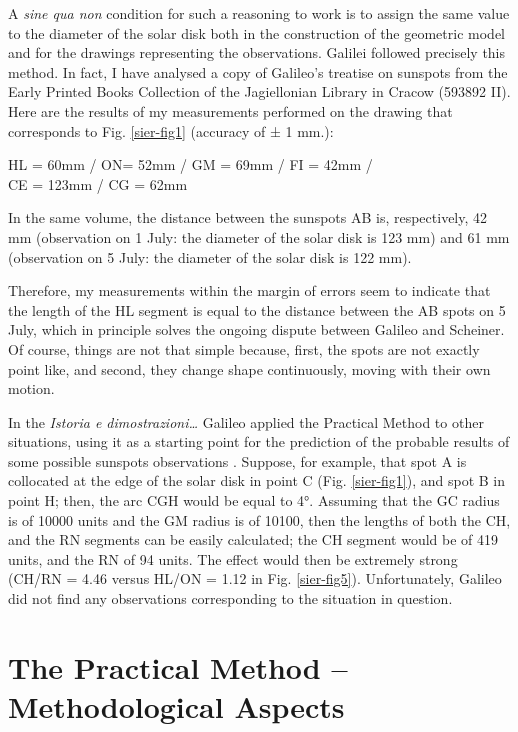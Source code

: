 \begin{artengenv}
A \textit{sine qua non} condition for such a reasoning to work is to assign the same value to the diameter of the solar
disk both in the construction of the geometric model and for the drawings representing the observations. Galilei
followed precisely this method. In fact, I have analysed a copy of Galileo’s treatise on sunspots from the Early
Printed Books Collection of the Jagiellonian Library in Cracow (593892 II). Here are the results of my measurements
performed on the drawing that corresponds to Fig. \ref{sier-fig1} (accuracy of ± 1 mm.):
\medskip

{\centering
HL = 60mm / ON= 52mm / GM = 69mm / FI = 42mm /\\CE = 123mm / CG = 62mm
\par}
\smallskip

In the same volume, the distance between the sunspots AB is, respectively, 42 mm (observation on 1 July: the diameter of
the solar disk is 123 mm) and 61 mm (observation on 5 July: the diameter of the solar disk is 122 mm).

Therefore, my measurements within the margin of errors seem to indicate that the length of the HL segment is equal to
the distance between the AB spots on 5 July, which in principle solves the ongoing dispute between Galileo and
Scheiner. Of course, things are not that simple because, first, the spots are not exactly point like, and second, they
change shape continuously, moving with their own motion.

In the \textit{Istoria e dimostrazioni\ldots} Galileo applied the Practical Method to other situations, using it as a
starting point for the prediction of the probable results of some possible sunspots observations
\parencite[see OG V, 124.13-21;][p.116]{galilei_sunspots_2010}.
 Suppose, for example, that spot A is collocated
at the edge of the solar disk in point C (Fig. \ref{sier-fig1}), and spot B in point H; then, the arc CGH would be equal to 4°.
Assuming that the GC radius is of 10000 units and the GM radius is of 10100, then the lengths of both the CH, and the
RN segments can be easily calculated; the CH segment would be of 419 units, and the RN of 94 units. The effect would
then be extremely strong (CH/RN = 4.46 versus HL/ON = 1.12 in Fig. \ref{sier-fig5}). Unfortunately, Galileo did not find any
observations corresponding to the situation in question.

\section{The Practical Method -- Methodological Aspects}


\end{artengenv}
